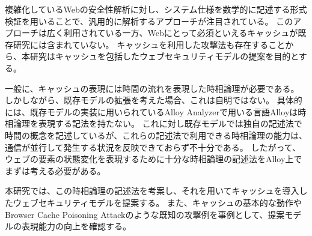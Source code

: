\documentclass[journal]{IEEEtran}
\begin{document}
複雑化しているWebの安全性解析に対し、システム仕様を数学的に記述する形式検証を用いることで、汎用的に解析するアプローチが注目されている。
このアプローチは広く利用されている一方、Webにとって必須といえるキャッシュが既存研究には含まれていない。
キャッシュを利用した攻撃法も存在することから、本研究はキャッシュを包括したウェブセキュリティモデルの提案を目的とする。

一般に、キャッシュの表現には時間の流れを表現した時相論理が必要である。
しかしながら、既存モデルの拡張を考えた場合、これは自明ではない。
具体的には、既存モデルの実装に用いられているAlloy Analyzerで用いる言語Alloyは時相論理を表現する記法を持たない。
これに対し既存モデルでは独自の記述法で時間の概念を記述しているが、これらの記述法で利用できる時相論理の能力は、通信が並行して発生する状況を反映できておらず不十分である。
したがって、ウェブの要素の状態変化を表現するために十分な時相論理の記述法をAlloy上でまずは考える必要がある。

本研究では、この時相論理の記述法を考案し、それを用いてキャッシュを導入したウェブセキュリティモデルを提案する。
また、キャッシュの基本的な動作やBrowser Cache Poisoning Attackのような既知の攻撃例を事例として、提案モデルの表現能力の向上を確認する。
\end{document}
